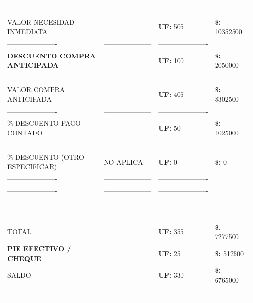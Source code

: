 \documentclass[10pt]{article}
\begin{document}
\begin{tabular}{llll}
\hline
\color{white}---------------------- & \color{white}--------------------- & \color{white}---------------------- \\
VALOR NECESIDAD INMEDIATA &  & \textbf{UF: } 505 & \textbf{\$: }10352500 \\ 
\color{white}---------------------- & \color{white}--------------------- & \color{white}---------------------- \\
\textbf{DESCUENTO COMPRA ANTICIPADA} & & \textbf{UF: }100& \textbf{\$: }2050000 \\ 
\color{white}---------------------- & \color{white}--------------------- & \color{white}---------------------- \\
VALOR COMPRA ANTICIPADA &  & \textbf{UF: }405& \textbf{\$: }8302500 \\  
\color{white}---------------------- & \color{white}--------------------- & \color{white}---------------------- \\
\% DESCUENTO PAGO CONTADO &  & \textbf{UF: }50& \textbf{\$: }1025000 \\  
\color{white}---------------------- & \color{white}--------------------- & \color{white}---------------------- \\
\% DESCUENTO (OTRO ESPECIFICAR) &NO APLICA& \textbf{UF: }0& \textbf{\$: }0 \\  
\color{white}---------------------- & \color{white}--------------------- & \color{white}---------------------- \\
\color{white}---------------------- & \color{white}--------------------- & \color{white}---------------------- \\
\color{white}---------------------- & \color{white}--------------------- & \color{white}---------------------- \\
\color{white}---------------------- & \color{white}--------------------- & \color{white}---------------------- \\
TOTAL &  & \textbf{UF: }355& \textbf{\$: }7277500 \\  
\textbf{PIE EFECTIVO / CHEQUE} &  & \textbf{UF: }25& \textbf{\$: }512500 \\   
SALDO &  & \textbf{UF: }330 & \textbf{\$: } 6765000 \\  
\color{white}---------------------- & \color{white}--------------------- & \color{white}---------------------- \\
\hline
\end{tabular}
\end{document}
